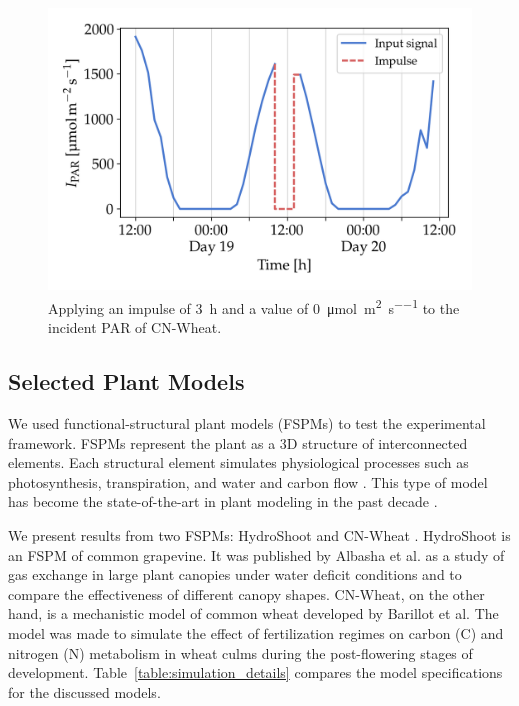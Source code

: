 \documentclass[10pt,a4paper,journal]{IEEEtran}
\begin{document}
\begin{figure}[t]
	\centering
    \includegraphics[width=0.93\linewidth]{imgs/cn_impulse.png}
    \vspace{-0.25cm}
	\caption{\small Applying an impulse of \SI{3}{\hour} and a value of \SI{0}{\micro\mole\per\square\meter\per\second} to the incident PAR of CN-Wheat.}
	\label{fig:methods-impulse}
\end{figure}

\subsection{Selected Plant Models}

We used functional-structural plant models (FSPMs) to test the experimental framework.
FSPMs represent the plant as a 3D structure of interconnected elements.
Each structural element simulates physiological processes such as photosynthesis, transpiration, and water and carbon flow \cite{coussement_turgor-driven_2020}.
This type of model has become the state-of-the-art in plant modeling in the past decade \cite{louarn_two_2020}.

We present results from two FSPMs: HydroShoot \cite{albasha_hydroshoot_2019} and CN-Wheat \cite{barillot_cn-wheat_2016}.
HydroShoot is an FSPM of common grapevine.
It was published by Albasha et al. as a study of gas exchange in large plant canopies under water deficit conditions and to compare the effectiveness of different canopy shapes.
CN-Wheat, on the other hand, is a mechanistic model of common wheat developed by Barillot et al.
The model was made to simulate the effect of fertilization regimes on carbon (C) and nitrogen (N) metabolism in wheat culms during the post-flowering stages of development.
\mbox{Table \ref{table:simulation_details}} compares the model specifications for the discussed models.
\end{document}

